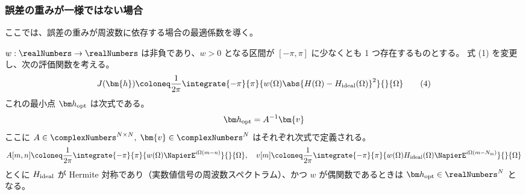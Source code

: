         \subsubsection{誤差の重みが一様ではない場合}
            ここでは、誤差の重みが周波数に依存する場合の最適係数を導く。
            \begin{shadebox}
                $w:\realNumbers\to\realNumbers$ は非負であり、$w>0$ となる区間が $[-\pi,\pi]$ に少なくとも 1 つ存在するものとする。
                式 (1) を変更し、次の評価関数を考える。
                \[ J(\bm{h}) \coloneq \frac{1}{2\pi}\integrate{-\pi}{\pi}{w(\Omega)\abs{H(\Omega)-\Hideal(\Omega)}^2}{}{\Omega}\tag{4} \]
                これの最小点 $\vhOpt$ は次式である。
                \[ \vhOpt = A^{-1}\bm{v} \]
                ここに $A\in\complexNumbers^{N\times N},\;\bm{v}\in\complexNumbers^N$ はそれぞれ次式で定義される。
                \[ A[m,n] \coloneq \frac{1}{2\pi}\integrate{-\pi}{\pi}{w(\Omega)\NapierE^{i\Omega(m-n)}}{}{\Omega},\quad v[m] \coloneq \frac{1}{2\pi}\integrate{-\pi}{\pi}{w(\Omega)\Hideal(\Omega)\NapierE^{i\Omega (m-\Nm)}}{}{\Omega} \]
                とくに $H_\text{ideal}$ が Hermite 対称であり（実数値信号の周波数スペクトラム）、かつ $w$ が偶関数であるときは $\vhOpt\in\realNumbers^N$ となる。
            \end{shadebox}
